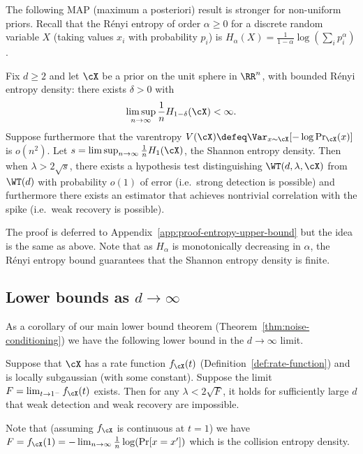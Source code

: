 \documentclass{article}
\begin{document}
The following MAP (maximum a posteriori) result is stronger for non-uniform priors. Recall that the R\'enyi entropy of order $\alpha \ge 0$ for a discrete random variable $X$ (taking values $x_i$ with probability $p_i$) is $H_\alpha(X) = \frac{1}{1-\alpha} \log\left(\sum_i p_i^\alpha\right)$.
\begin{proposition}\label{prop:entropy-upper-bound}
Fix $d\ge 2$ and let $\cX$ be a prior on the unit sphere in $\RR^n$, with bounded R\'enyi entropy density: there exists $\delta > 0$ with 
$$ \limsup_{n \to \infty} \frac1n H_{1-\delta}(\cX) < \infty. $$
Suppose furthermore that the varentropy $V(\cX) \defeq \Var_{x \sim \cX}[-\log \Pr_\cX(x)]$ is $o(n^2)$.
Let $s = \limsup_{n \to \infty} \frac{1}{n} H_1(\cX)$, the Shannon entropy density. Then when $\lambda > 2\sqrt{s}$, there exists a hypothesis test distinguishing $\WT(d,\lambda,\cX)$ from $\WT(d)$ with probability $o(1)$ of error (i.e.\ strong detection is possible) and furthermore there exists an estimator that achieves nontrivial correlation with the spike (i.e.\ weak recovery is possible).
\end{proposition}
\noindent The proof is deferred to Appendix~\ref{app:proof-entropy-upper-bound} but the idea is the same as above. Note that as $H_\alpha$ is monotonically decreasing in $\alpha$, the R\'enyi entropy bound guarantees that the Shannon entropy density is finite.






\subsection{Lower bounds as $d \to \infty$}

As a corollary of our main lower bound theorem (Theorem~\ref{thm:noise-conditioning}) we have the following lower bound in the $d \to \infty$ limit.
\begin{proposition}\label{prop:renyi-lower-bound}
Suppose that $\cX$ has a rate function $f_\cX(t)$ (Definition~\ref{def:rate-function}) and is locally subgaussian (with some constant). Suppose the limit $F = \lim_{t \to 1^-} f_\cX(t)$ exists. Then for any $\lambda < 2 \sqrt{F}$, it holds for sufficiently large $d$ that weak detection and weak recovery are impossible.
\end{proposition}
\noindent Note that (assuming $f_\cX$ is continuous at $t=1$) we have $F = f_\cX(1) = - \lim_{n \to \infty} \frac{1}{n} \log(\Pr[ x = x' ])$ which is the collision entropy density.
\end{document}
